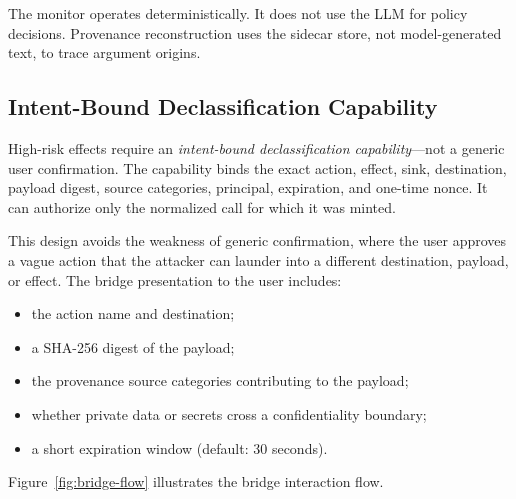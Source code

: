 \documentclass[sigconf,anonymous,review]{acmart}
\begin{document}
The monitor operates deterministically. It does not use the LLM for policy decisions. Provenance reconstruction uses the sidecar store, not model-generated text, to trace argument origins.

\subsection{Intent-Bound Declassification Capability}
\label{sec:bridge}

High-risk effects require an \emph{intent-bound declassification capability}---not a generic user confirmation. The capability binds the exact action, effect, sink, destination, payload digest, source categories, principal, expiration, and one-time nonce. It can authorize only the normalized call for which it was minted.

This design avoids the weakness of generic confirmation, where the user approves a vague action that the attacker can launder into a different destination, payload, or effect. The bridge presentation to the user includes:
\begin{itemize}
  \item the action name and destination;
  \item a SHA-256 digest of the payload;
  \item the provenance source categories contributing to the payload;
  \item whether private data or secrets cross a confidentiality boundary;
  \item a short expiration window (default: 30 seconds).
\end{itemize}

Figure~\ref{fig:bridge-flow} illustrates the bridge interaction flow.
\end{document}
